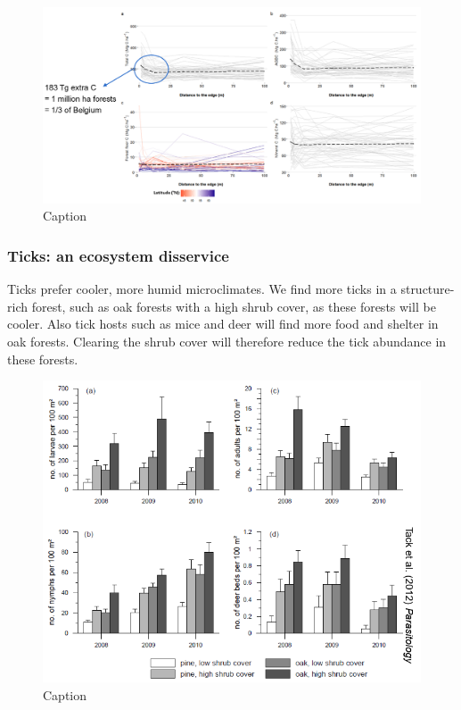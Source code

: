 \documentclass[12pt,oneside]{book}
\begin{document}
\begin{figure}

{\centering \includegraphics[width=1\linewidth]{figures/Figure1038} 

}

\caption{Caption}\label{fig:Micro38}
\end{figure}

\subsubsection{Ticks: an ecosystem
disservice}\label{ticks-an-ecosystem-disservice}

Ticks prefer cooler, more humid microclimates. We find more ticks in a
structure-rich forest, such as oak forests with a high shrub cover, as
these forests will be cooler. Also tick hosts such as mice and deer will
find more food and shelter in oak forests. Clearing the shrub cover will
therefore reduce the tick abundance in these forests.

\begin{figure}

{\centering \includegraphics[width=1\linewidth]{figures/Figure1039} 

}

\caption{Caption}\label{fig:Micro39}
\end{figure}
\end{document}

